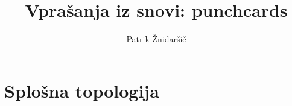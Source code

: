 \documentclass{report}
\title{Vprašanja iz snovi: punchcards}
\author{Patrik Žnidaršič}
\date{}
\newcounter{vprasanja}
\begin{document}
\maketitle

\setcounter{vprasanja}{0}
\chapter{Splošna topologija}
\pagebreak

\end{document}
